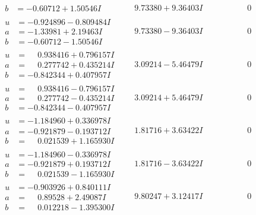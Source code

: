 \documentclass[1p]{elsarticle_modified}
\theoremstyle{definition}
\begin{document}
$$\begin{array}{c|c|c}
\begin{aligned}
b &= -0.60712 + 1.50546 I\end{aligned}
 & \phantom{-}9.73380 + 9.36403 I & \phantom{-0.000000 } 0 \\ \hline\begin{aligned}
u &= -0.924896 - 0.809484 I \\
a &= -1.33981 + 2.19463 I \\
b &= -0.60712 - 1.50546 I\end{aligned}
 & \phantom{-}9.73380 - 9.36403 I & \phantom{-0.000000 } 0 \\ \hline\begin{aligned}
u &= \phantom{-}0.938416 + 0.796157 I \\
a &= \phantom{-}0.277742 + 0.435214 I \\
b &= -0.842344 + 0.407957 I\end{aligned}
 & \phantom{-}3.09214 - 5.46479 I & \phantom{-0.000000 } 0 \\ \hline\begin{aligned}
u &= \phantom{-}0.938416 - 0.796157 I \\
a &= \phantom{-}0.277742 - 0.435214 I \\
b &= -0.842344 - 0.407957 I\end{aligned}
 & \phantom{-}3.09214 + 5.46479 I & \phantom{-0.000000 } 0 \\ \hline\begin{aligned}
u &= -1.184960 + 0.336978 I \\
a &= -0.921879 - 0.193712 I \\
b &= \phantom{-}0.021539 + 1.165930 I\end{aligned}
 & \phantom{-}1.81716 + 3.63422 I & \phantom{-0.000000 } 0 \\ \hline\begin{aligned}
u &= -1.184960 - 0.336978 I \\
a &= -0.921879 + 0.193712 I \\
b &= \phantom{-}0.021539 - 1.165930 I\end{aligned}
 & \phantom{-}1.81716 - 3.63422 I & \phantom{-0.000000 } 0 \\ \hline\begin{aligned}
u &= -0.903926 + 0.840111 I \\
a &= \phantom{-}0.89528 + 2.49087 I \\
b &= \phantom{-}0.012218 - 1.395300 I\end{aligned}
 & \phantom{-}9.80247 + 3.12417 I & \phantom{-0.000000 } 0 \\ \hline\begin{aligned}

\end{aligned}
\end{array}$$
\end{document}
